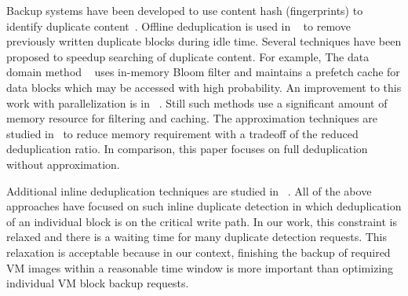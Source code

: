 Backup systems have been developed to use content hash (fingerprints) to identify duplicate
content~\cite{venti02,Rhea2008}.
Offline deduplication is used in ~\cite{EMC,NetAppOffline} to remove previously written duplicate blocks during idle time.
Several techniques have been proposed to speedup searching of duplicate
content. For example,
The data domain method ~\cite{bottleneck08} 
uses  in-memory Bloom filter and maintains a prefetch cache for data blocks  which may be
accessed with high probability.  An improvement to this work with parallelization is in ~\cite{DEBAR}.
Still such methods use  a significant amount of memory resource for filtering and caching.
The approximation techniques are studied in~\cite{extreme_binning09,WeiZhangIEEE}  
to reduce memory requirement with a tradeoff of the reduced deduplication ratio.
In comparison, this paper focuses on  full deduplication without approximation.

Additional inline deduplication techniques are studied in ~\cite{sparseindex09,Guo2011,idedup}. 
All of the above approaches have focused on
such inline duplicate detection in which  deduplication of an individual block  is on the critical write path.
In our work, this constraint is relaxed and 
there is a waiting time for many duplicate detection requests. This relaxation is acceptable because 
in our context, finishing the backup of required VM images within a reasonable time window is more
important than optimizing individual VM block  backup requests.

  
